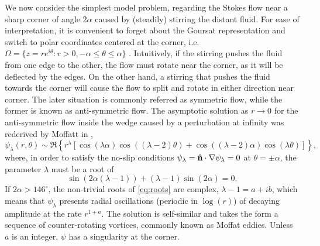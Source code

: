 We now consider the simplest model problem, regarding the Stokes flow near a sharp corner of angle $2\alpha$ caused by (steadily) stirring the distant fluid. For ease of interpretation, it is convenient to forget about the Goursat representation and switch to polar coordinates centered at the corner, i.e. $\Omega = \{z = re^{i\theta} : r > 0, -\alpha \leq \theta \leq \alpha \}$ . Intuitively, if the stirring pushes the fluid from one edge to the other, the flow must rotate near the corner, as it will be deflected by the edges. On the other hand, a stirring that pushes the fluid towards the corner will cause the flow to split and rotate in either direction near corner. The later situation is commonly referred as symmetric flow, while the former is known as anti-symmetric flow. The asymptotic solution as $r\to 0$ for the anti-symmetric flow inside the wedge caused by a perturbation at infinity was rederived by Moffatt in \cite{moffatt},
\begin{equation}
\psi_\lambda(r,\theta) \sim \Re\left\{r^\lambda \left[\cos{(\lambda\alpha)}\cos{\left((\lambda-2)\theta\right)}+\cos{\left((\lambda-2)\alpha\right)}\cos{(\lambda\theta)}\right]\right\},
\end{equation}
where, in order to satisfy the no-slip conditions $\psi_\lambda=\mathbf{\hat{n}}\cdot\nabla\psi_\lambda=0$ at $\theta=\pm\alpha$, the parameter $\lambda$ must be a root of
\begin{equation}\label{eq:roots}
\sin{\left(2\alpha(\lambda-1)\right)} + (\lambda-1)\sin{(2\alpha)}=0.
\end{equation}
If $2\alpha>146^\circ$, the non-trivial roots of \eqref{eq:roots} are complex, $\lambda-1=a + ib$, which means that $\psi_\lambda$ presents radial oscillations (periodic in $\log(r)$) of decaying amplitude at the rate  $r^{1+a}$. The solution is self-similar and takes the form a sequence of counter-rotating vortices, commonly known as Moffat eddies. Unless $a$ is an integer, $\psi$ has a singularity at the corner.

